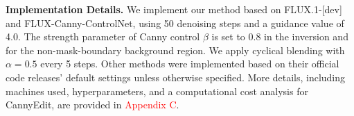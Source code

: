 \documentclass{article}
\begin{document}

\textbf{Implementation Details.} We implement our method based on FLUX.1-[dev]\cite{blackforest2024FLUX} and FLUX-Canny-ControlNet\cite{xlabsai2025fluxcontrolnet}, using 50 denoising steps and a guidance value of 4.0. The strength parameter of Canny control $\beta$ is set to 0.8 in the inversion and for the non-mask-boundary background region. We apply cyclical blending with $\alpha=0.5$ every 5 steps. Other methods were implemented based on their official code releases' default settings unless otherwise specified. More details, including machines used, hyperparameters, and a computational cost analysis for CannyEdit, are provided in \textcolor{red}{Appendix C}.
\end{document}
